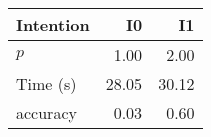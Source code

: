 \begin{tabular}{lrr}
\toprule
Intention & I0 & I1 \\
\midrule
$p$ & 1.00 & 2.00 \\
Time (s) & 28.05 & 30.12 \\
accuracy & 0.03 & 0.60 \\
\bottomrule
\end{tabular}
